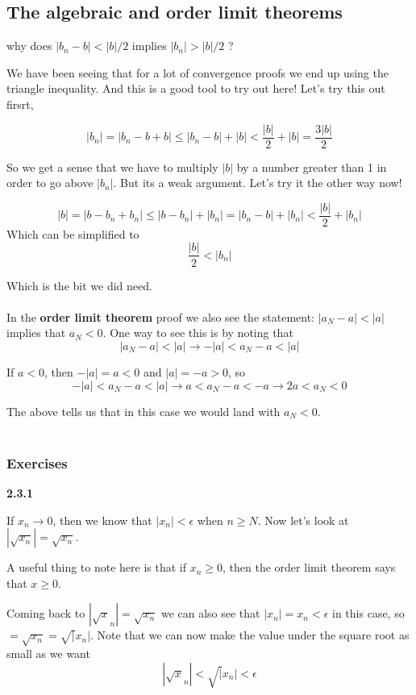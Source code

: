 \subsection{The algebraic and order limit theorems}

why does $|b_n - b| < |b|/2$  implies $|b_n| > |b|/2$ ?

We have been seeing that for a lot of convergence proofs we end up using the triangle inequality.
And this is a good tool to try out here!
Let's try this out firsrt,

$$
|b_n| = | b_n - b + b | \leq |b_n - b| + |b| < \frac{|b|}{2} + |b| = \frac{3|b|}{2}
$$

So we get a sense that we have to multiply $|b|$ by a number greater than 1 in order to go above
$|b_n|$.
But its a weak argument.
Let's try it the other way now!

$$
|b| = |b - b_n + b_n| \leq |b - b_n| + |b_n| = |b_n -b| + |b_n| < \frac{|b|}{2} + |b_n|
$$
Which can be simplified to
$$
\frac{|b|}{2} < |b_n|
$$

Which is the bit we did need.
\\~\\

In the \textbf{order limit theorem} proof we also see the statement: $|a_N - a| < |a|$ implies
that $a_N < 0$.
One way to see this is by noting that
$$
|a_N - a| < |a| \rightarrow -|a| < a_N - a < |a|
$$

If $a<0$, then $-|a| = a < 0$ and $|a| = -a > 0$, so
$$
-|a| < a_N - a < |a| \rightarrow a < a_N - a < -a \rightarrow 2a < a_N < 0
$$

The above tells us that in this case we would land with $a_N < 0$.
\\~\\


\subsubsection{Exercises}

\textbf{2.3.1}

If $x_n \rightarrow 0$, then we know that $|x_n| < \epsilon$ when $n \geq N$.
Now let's look at $|\sqrt{x_n}| = \sqrt{x_n}$.

A useful thing to note here is that if $x_n \geq 0$, then the order limit theorem says
that $x\geq 0$.

Coming back to $|\sqrt x_n| = \sqrt{x_n}$ we can also see that $|x_n| = x_n < \epsilon$ in this case,
so $ = \sqrt{x_n} =\sqrt |x_n|$. Note that we can now make the
value under the square root as small as we want
$$
|\sqrt x_n | < \sqrt |x_n| < \epsilon
$$
\\~\\

